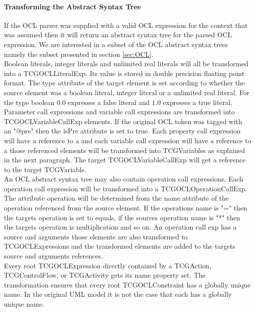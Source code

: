 \paragraph{Transforming the Abstract Syntax Tree}
If the OCL parser was supplied with a valid OCL expression for the context that was assumed then it will return an abstract syntax tree for the parsed OCL expression. We are interested in a subset of the OCL abstract syntax trees namely the subset presented in section \ref{sec:OCL}. \\
Boolean literals, integer literals and unlimited real literals will all be transformed into a TCGOCLLiteralExp. Its value is stored in double precision floating point format. The type attribute of the target element is set according to whether the source element was a boolean literal, integer literal or a unlimited real literal. For the type boolean $0.0$ expresses a false literal and $1.0$ expresses a true literal.\\
Parameter call expressions and variable call expressions are transformed into TCGOCLVariableCallExp elements. If the original OCL token was tagged with an "@pre" then the isPre attribute is set to true. Each property call expression will have a reference to a  and each variable call expression will have a reference to a  those referenced elements will be transformed into TCGVariables as explained in the next paragraph. The target TCGOCLVariableCallExp will get a reference to the target TCGVariable.\\
An OCL abstract syntax tree may also contain operation call expressions. Each operation call expression will be transformed into a TCGOCLOperationCallExp. The attribute operation will be determined from the name attribute of the operation referenced from the source element. If the operations name is "=" then the targets operation is set to equals, if the sources operation name is "*" then the targets operation is multiplication and so on. An operation call exp has a source and arguments those elements are also transformed to TCGOCLExpressions and the transformed elements are added to the targets source and arguments references.\\
Every root TCGOCLExpression directly contained by a TCGAction, TCGControlFlow, or TCGActivity gets its name property set. The transformation ensures that every root TCGOCLConstraint has a globally unique name. In the original UML model it is not the case that each  has a globally unique name.

